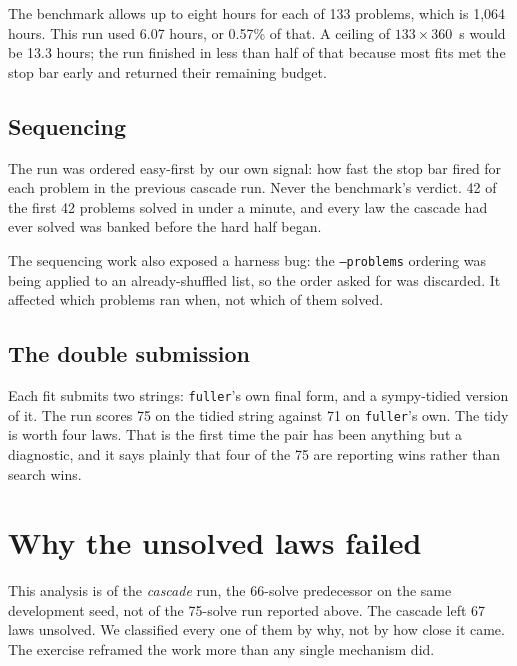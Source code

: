 \documentclass[11pt,a4paper]{article}
\begin{document}
The benchmark allows up to eight hours for each of 133 problems, which is
1{,}064 hours. This run used 6.07 hours, or 0.57\% of that. A ceiling of
$133 \times 360$~s would be 13.3 hours; the run finished in less than half of
that because most fits met the stop bar early and returned their remaining
budget.

\subsection{Sequencing}

The run was ordered easy-first by our own signal: how fast the stop bar fired for
each problem in the previous cascade run. Never the benchmark's verdict. 42 of
the first 42 problems solved in under a minute, and every law the cascade had
ever solved was banked before the hard half began.

The sequencing work also exposed a harness bug: the
\texttt{--problems} ordering was being applied to an already-shuffled list, so
the order asked for was discarded. It affected which problems ran when, not which
of them solved.

\subsection{The double submission}

Each fit submits two strings: \texttt{fuller}'s own final form, and a
sympy-tidied version of it. The run scores 75 on the tidied string against 71 on
\texttt{fuller}'s own. The tidy is worth four laws. That is the first time the
pair has been anything but a diagnostic, and it says plainly that four of the 75
are reporting wins rather than search wins.

\section{Why the unsolved laws failed}
\label{sec:failure}

This analysis is of the \emph{cascade} run, the 66-solve predecessor on the same
development seed, not of the 75-solve run reported above. The cascade left 67
laws unsolved. We classified every one of them by why, not by how close it came.
The exercise reframed the work more than any single mechanism did.
\end{document}
